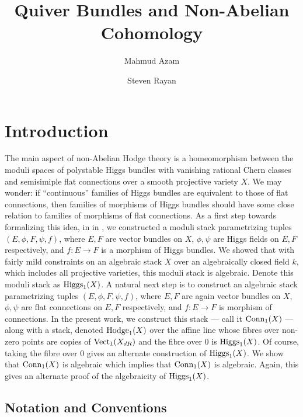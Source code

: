 \documentclass[11pt]{amsart}
\title[Quiver Bundles and Non-Abelian Cohomology]
      {Quiver Bundles and Non-Abelian Cohomology}
\author{Mahmud Azam}
\author{Steven Rayan}
\begin{document}
\begin{abstract}
\end{abstract}

\maketitle

\tableofcontents


\section{Introduction}

The main aspect of non-Abelian Hodge theory
is a homeomorphism between the moduli spaces of polystable Higgs bundles
with vanishing rational Chern classes and semisimiple flat connections over
a smooth projective variety $X$. We may wonder:
if ``continuous'' families of Higgs bundles are equivalent to those of flat
connections, then families of morphisms of Higgs bundles should have some close
relation to families of morphisms of flat connections.
As a first step towards formalizing this idea, in \cite{ModQuivBun}
in \cite{ModQuivBun}, we constructed a moduli stack parametrizing tuples
$(E, \phi, F, \psi, f)$, where $E, F$ are vector bundles on $X$,
$\phi, \psi$ are Higgs fields on $E, F$ respectively, and $f : E \to F$
is a morphism of Higgs bundles. We showed that with fairly mild constraints
on an algebraic stack $X$ over an algebraically closed field $k$, which includes
all projective varieties, this moduli stack is algebraic.
Denote this moduli stack as $\mathrm{Higgs}_1(X)$. A natural next step is
to construct an algebraic stack parametrizing tuples $(E, \phi, F, \psi, f)$,
where $E, F$ are again vector bundles on $X$, $\phi, \psi$ are flat connections
on $E, F$ respectively, and $f : E \to F$ is morphism of connections.
In the present work, we construct this stack --- call it $\mathrm{Conn}_1(X)$ ---
along with a stack, denoted $\mathrm{Hodge}_1(X)$ over the affine line whose fibres over
non-zero points are copies of $\mathrm{Vect}_1(X_{dR})$ and the fibre over $0$ is
$\mathrm{Higgs}_1(X)$. Of course, taking the fibre over $0$ gives an alternate
construction of $\mathrm{Higgs}_1(X)$. We show that $\mathrm{Conn}_1(X)$ is algebraic
which implies that $\mathrm{Conn}_1(X)$ is algebraic. Again, this gives an alternate
proof of the algebraicity of $\mathrm{Higgs}_1(X)$.

\subsection{Notation and Conventions}
\end{document}
